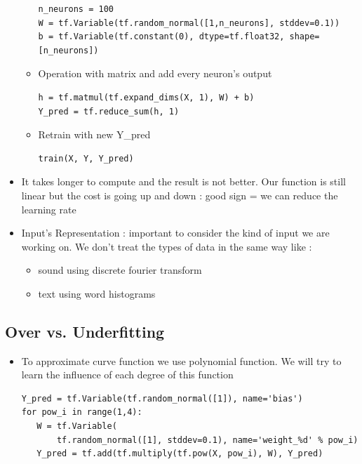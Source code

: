 \documentclass[12pt,a4paper]{article}
\begin{document}
\begin{itemize}
\begin{itemize}
\begin{lstlisting}
n_neurons = 100
W = tf.Variable(tf.random_normal([1,n_neurons], stddev=0.1))
b = tf.Variable(tf.constant(0), dtype=tf.float32, shape=[n_neurons])
\end{lstlisting}
\item Operation with matrix and add every neuron's output
\begin{lstlisting}
h = tf.matmul(tf.expand_dims(X, 1), W) + b)
Y_pred = tf.reduce_sum(h, 1)
\end{lstlisting}
\item Retrain with new Y\_pred
\begin{lstlisting}
train(X, Y, Y_pred)
\end{lstlisting}
\end{itemize}
\item It takes longer to compute and the result is not better. Our function is still linear but the cost is going up and down : good sign = we can reduce the learning rate
\item Input's Representation : important to consider the kind of input we are working on. We don't treat the types of data in the same way like :
\begin{itemize}
\item sound using discrete fourier transform
\item text using word histograms
\end{itemize}
\end{itemize}
\subsection{Over vs. Underfitting}
\begin{itemize}
\item To approximate curve function we use polynomial function. We will try to learn the influence of each degree of this function
\begin{lstlisting}
Y_pred = tf.Variable(tf.random_normal([1]), name='bias')
for pow_i in range(1,4):
   W = tf.Variable(
       tf.random_normal([1], stddev=0.1), name='weight_%d' % pow_i)
   Y_pred = tf.add(tf.multiply(tf.pow(X, pow_i), W), Y_pred)
\end{lstlisting}
\end{itemize}
\end{document}
